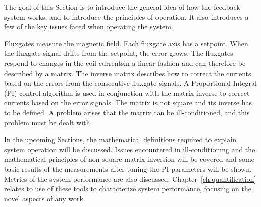
The goal of this Section is to introduce the general idea of how the feedback system works, and to introduce the principles of operation.  It also introduces a few of the key issues faced when operating the system. 

Fluxgates measure the magnetic field. Each fluxgate axis has a setpoint. When the fluxgate signal drifts from the setpoint, the error grows. The fluxgates respond to changes in the coil currentsin a linear fashion and can therefore be described by a matrix. The inverse matrix describes how to correct the currents based on the errors from the consecutive fluxgate signals. A Proportional Integral (PI) control algorithm  is used in conjunction with the matrix inverse to correct currents based on the error signals. The matrix is not square and its inverse has to be defined. A problem arises that the matrix can be ill-conditioned, and this problem must be dealt with. 

In the upcoming Sections, the mathematical definitions required to explain system operation will be discussed. Issues encountered in ill-conditioning and the mathematical principles of non-square matrix inversion will be covered and some basic results of the measurements after tuning the PI parameters will be shown. Metrics of the system performance are also discussed. Chapter~\ref{ch:quantification} relates to use of these tools to characterize system performance, focusing on the novel aspects of any work.

